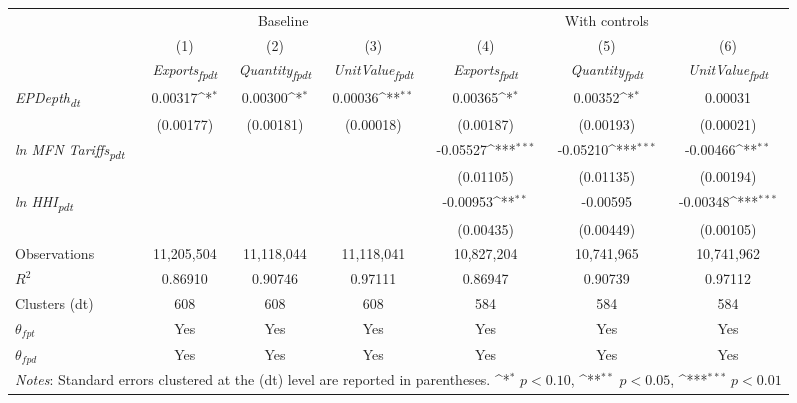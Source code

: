 {
\def\sym#1{\ifmmode^{#1}\else\(^{#1}\)\fi}
\begin{tabular}{l*{6}{c}}
\toprule
&\multicolumn{3}{c}{Baseline}&\multicolumn{3}{c}{With controls}\\\cmidrule(lr){2-4}\cmidrule(lr){5-7}
&(1)&(2)&(3)&(4)&(5)&(6)\\
&\textit{Exports\textsubscript{fpdt}}&\textit{Quantity\textsubscript{fpdt}}&\textit{UnitValue\textsubscript{fpdt}}&\textit{Exports\textsubscript{fpdt}}&\textit{Quantity\textsubscript{fpdt}}&\textit{UnitValue\textsubscript{fpdt}}\\
\midrule
\textit{EPDepth\textsubscript{dt}} & 0.00317\sym{*} & 0.00300\sym{*} & 0.00036\sym{**} & 0.00365\sym{*} & 0.00352\sym{*} & 0.00031\\
 & (0.00177) & (0.00181) & (0.00018) & (0.00187) & (0.00193) & (0.00021)\\
\addlinespace
\textit{ln MFN Tariffs\textsubscript{pdt}} &  &  &  & -0.05527\sym{***} & -0.05210\sym{***} & -0.00466\sym{**}\\
 &  &  &  & (0.01105) & (0.01135) & (0.00194)\\
\addlinespace
\textit{ln HHI\textsubscript{pdt}} &  &  &  & -0.00953\sym{**} & -0.00595 & -0.00348\sym{***}\\
 &  &  &  & (0.00435) & (0.00449) & (0.00105)\\
\midrule
Observations & 11,205,504 & 11,118,044 & 11,118,041 & 10,827,204 & 10,741,965 & 10,741,962\\
$R^{2}$ & 0.86910 & 0.90746 & 0.97111 & 0.86947 & 0.90739 & 0.97112\\
Clusters (dt) & 608 & 608 & 608 & 584 & 584 & 584\\
$\theta_{fpt}$ & Yes & Yes & Yes & Yes & Yes & Yes\\
$\theta_{fpd}$ & Yes & Yes & Yes & Yes & Yes & Yes\\
\bottomrule
\multicolumn{7}{l}{\footnotesize \textit{Notes}: Standard errors clustered at the (dt) level are reported in parentheses. \sym{*} \(p<0.10\), \sym{**} \(p<0.05\), \sym{***} \(p<0.01\)}\\
\end{tabular}
}
